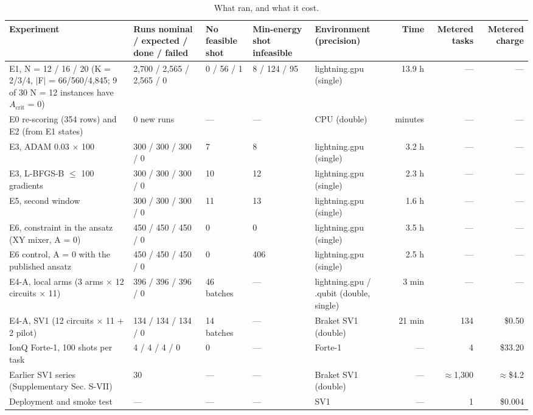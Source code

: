 \documentclass{ieeeaccess}
\begin{document}
\begin{table}[!t]
\centering
\scriptsize
\caption{What ran, and what it cost.}
\label{tab:II}
\begin{tabular}{p{}p{}p{}p{}p{}rrr}
\toprule
Experiment & Runs nominal / expected / done / failed & No feasible shot & Min-energy shot infeasible & Environment (precision) & Time & Metered tasks & Metered charge \\
\midrule
E1, N = 12 / 16 / 20 (K = 2/3/4, $|$F$|$ = 66/560/4,845; 9 of 30 N = 12 instances have $A_{\mathrm{crit}}$ = 0) & 2,700 / 2,565 / 2,565 / 0 & 0 / 56 / 1 & 8 / 124 / 95 & lightning.gpu (single) & 13.9 h & --- & --- \\
E0 re-scoring (354 rows) and E2 (from E1 states) & 0 new runs & --- & --- & CPU (double) & minutes & --- & --- \\
E3, ADAM 0.03 $\times$ 100 & 300 / 300 / 300 / 0 & 7 & 8 & lightning.gpu (single) & 3.2 h & --- & --- \\
E3, L-BFGS-B $\leq$ 100 gradients & 300 / 300 / 300 / 0 & 10 & 12 & lightning.gpu (single) & 2.3 h & --- & --- \\
E5, second window & 300 / 300 / 300 / 0 & 11 & 13 & lightning.gpu (single) & 1.6 h & --- & --- \\
E6, constraint in the ansatz (XY mixer, A = 0) & 450 / 450 / 450 / 0 & 0 & 0 & lightning.gpu (single) & 3.5 h & --- & --- \\
E6 control, A = 0 with the published ansatz & 450 / 450 / 450 / 0 & 0 & 406 & lightning.gpu (single) & 2.5 h & --- & --- \\
E4-A, local arms (3 arms $\times$ 12 circuits $\times$ 11) & 396 / 396 / 396 / 0 & 46 batches & --- & lightning.gpu / .qubit (double, single) & 3 min & --- & --- \\
E4-A, SV1 (12 circuits $\times$ 11 + 2 pilot) & 134 / 134 / 134 / 0 & 14 batches & --- & Braket SV1 (double) & 21 min & 134 & \$0.50 \\
IonQ Forte-1, 100 shots per task & 4 / 4 / 4 / 0 & 0 & --- & Forte-1 & --- & 4 & \$33.20 \\
Earlier SV1 series (Supplementary Sec. S-VII) & 30 & --- & --- & Braket SV1 (double) & --- & $\approx$1,300 & $\approx$\$4.2 \\
Deployment and smoke test & --- & --- & --- & SV1 & --- & 1 & \$0.004 \\
\bottomrule
\end{tabular}
\end{table}
\end{document}

